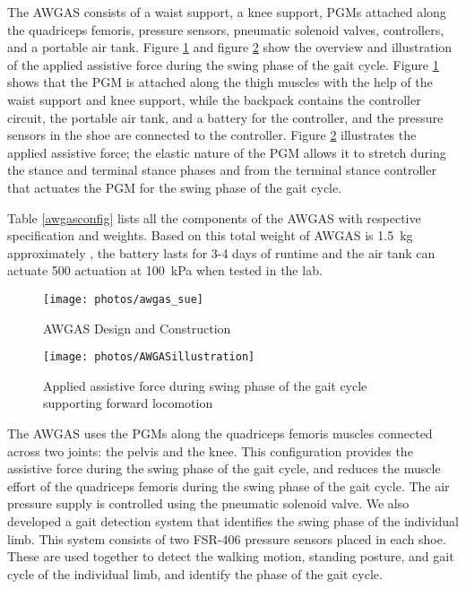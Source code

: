 \documentclass[paper,JRM,paper]{jaciiiarticle}
\begin{document}
The AWGAS consists of a waist support, a knee support, PGMs attached along the quadriceps femoris, pressure sensors, pneumatic solenoid valves, controllers, and a portable air tank. Figure \ref{fig:aws} and figure \ref{fig:awgasillustration} show the overview and illustration of the applied assistive force during the swing phase of the gait cycle. Figure \ref{fig:aws} shows that the PGM is attached along the thigh muscles with the help of the waist support and knee support, while the backpack contains the controller circuit, the portable air tank, and a battery for the controller, and the pressure sensors in the shoe are connected to the controller. Figure \ref{fig:awgasillustration} illustrates the applied assistive force; the elastic nature of the PGM allows it to stretch during the stance and terminal stance phases and from the terminal stance controller that actuates the PGM for the swing phase of the gait cycle.

Table \ref{awgasconfig} lists all the components of the AWGAS with respective specification and weights. Based on this total weight of AWGAS is \SI{1.5}{\kilogram} approximately , the battery lasts for 3-4 days of runtime and the air tank can actuate 500 actuation at \SI{100}{\kilo\pascal} when tested in the lab. 

\begin{figure}[h]
	\centering
	\texttt{[image: photos/awgas\_sue]}
	\caption{AWGAS Design and Construction}
	\label{fig:aws}
\end{figure}
\begin{figure}[h]
	\centering
	\texttt{[image: photos/AWGASillustration]}
	\caption{Applied assistive force during swing phase of the gait cycle supporting forward locomotion}
	\label{fig:awgasillustration}
\end{figure}


The AWGAS uses the PGMs along the quadriceps femoris muscles connected across two joints: the pelvis and the knee. This configuration provides the assistive force during the swing phase of the gait cycle, and reduces the muscle effort of the quadriceps femoris during the swing phase of the gait cycle. The air pressure supply is controlled using the pneumatic solenoid valve. We also developed a gait detection system that identifies the swing phase of the individual limb. This system consists of two FSR-406 pressure sensors placed in each shoe. These are used together to detect the walking motion, standing posture, and gait cycle of the individual limb, and identify the phase of the gait cycle.
\end{document}
